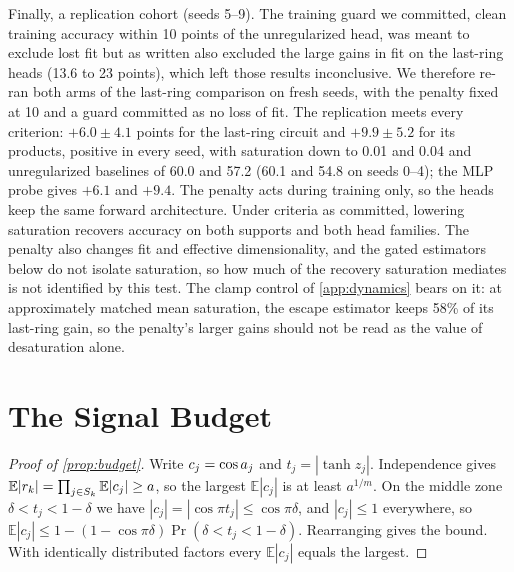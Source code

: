 Finally, a replication cohort (seeds 5--9). The training guard we committed, clean training accuracy
within 10 points of the unregularized head, was meant to exclude lost fit but as written also excluded
the large gains in fit on the last-ring heads (13.6 to 23 points), which left those results
inconclusive. We therefore re-ran both arms of the last-ring comparison on fresh seeds, with the penalty
fixed at 10 and a guard committed as no loss of fit. The replication meets every criterion: $+6.0\pm4.1$
points for the last-ring circuit and $+9.9\pm5.2$ for its products, positive in every seed, with
saturation down to 0.01 and 0.04 and unregularized baselines of 60.0 and 57.2 (60.1 and 54.8 on seeds 0--4); the MLP
probe gives $+6.1$ and $+9.4$. The penalty acts during training only, so the heads keep the same forward
architecture. Under criteria as committed, lowering saturation recovers accuracy on both supports and both head
families. The penalty also changes fit and effective dimensionality, and the gated estimators below
do not isolate saturation, so how much of the recovery saturation mediates is not identified by this test. The clamp control of \cref{app:dynamics} bears on it: at approximately matched mean saturation, the escape estimator keeps 58\% of its last-ring gain, so the penalty's larger gains should not be read as the value of desaturation alone.





\section{The Signal Budget}
\label{app:budget}

\begin{proof}[Proof of \cref{prop:budget}]
Write $c_j=\cos a_{j}$ and $t_j=|\tanh z_j|$. Independence gives
$\mathbb{E}|r_k|=\prod_{j\in S_k}\mathbb{E}|c_j|\ge a$, so the largest $\mathbb{E}|c_j|$ is at least
$a^{1/m}$. On the middle zone $\delta<t_j<1-\delta$ we have $|c_j|=|\cos\pi t_j|\le\cos\pi\delta$,
and $|c_j|\le1$ everywhere, so
$\mathbb{E}|c_j|\le1-(1-\cos\pi\delta)\Pr(\delta<t_j<1-\delta)$. Rearranging gives the bound. With
identically distributed factors every $\mathbb{E}|c_j|$ equals the largest.
\end{proof}

